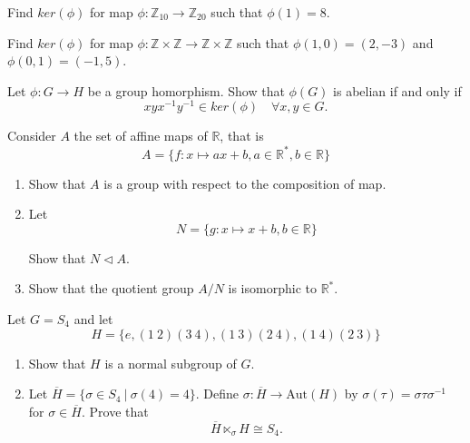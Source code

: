 \begin{mdframed}
    \vspace{0.752cm}
    \begin{Exercise}
        Find $ker(\phi)$ for map $\phi : \mathbb{Z}_{10} \to \mathbb{Z}_{20}$ such that 
        $\phi(1) = 8$.
    \end{Exercise}

    \vspace{0.752cm}
    \begin{Exercise}
        Find $ker(\phi)$ for map $\phi : \mathbb{Z} \times \mathbb{Z} \to \mathbb{Z} \times \mathbb{Z}$ such that 
        $\phi(1,0) = (2, -3)$ and $\phi(0,1) = (-1, 5)$.
    \end{Exercise}

    \vspace{0.752cm}
    \begin{Exercise}
        Let $\phi: G \to H$ be a group homorphism. Show that $\phi(G)$ is abelian if and only if
        \[
            xyx^{-1}y^{-1} \in ker(\phi) \quad \forall x, y \in G.
        \]
    \end{Exercise}

    \vspace{0.752cm}
    \begin{Exercise}
        Consider $A$ the set of affine maps of $\mathbb{R}$, that is 
        \[
            A = \{ f : x \mapsto ax + b, a \in \mathbb{R}^*, b \in \mathbb{R} \}
        \]
        \begin{enumerate}
            \item Show that $A$ is a group with respect to the composition of map.
            \item Let 
                \[
                    N = \{ g: x \mapsto x + b, b \in \mathbb{R} \}
                \]

                Show that $N \vartriangleleft A$.
            \item Show that the quotient group $A/N$ is isomorphic to $\mathbb{R}^*$.
        \end{enumerate}
    \end{Exercise}

    \vspace{0.752cm}
    \begin{Exercise}
        Let $G = S_4$ and let 
        \[
            H = \{ e, (1\> 2)(3 \> 4), (1\> 3)(2\> 4), (1\> 4)(2 \> 3)\}
        \]
        \begin{enumerate}
            \item Show that $H$ is a normal subgroup of $G$.
            \item Let $\overline{H} = \{ \sigma \in S_4 \> | \> \sigma(4) = 4 \}$. Define $\sigma : \overline{H} \to \text{Aut}(H)$
                by $\sigma(\tau) = \sigma \tau \sigma^{-1}$ for $\sigma \in \overline{H}$. Prove that 
                \[
                    \overline{H} \ltimes_\sigma H \cong S_4.
                \]
        \end{enumerate}
    \end{Exercise}


\end{mdframed}
